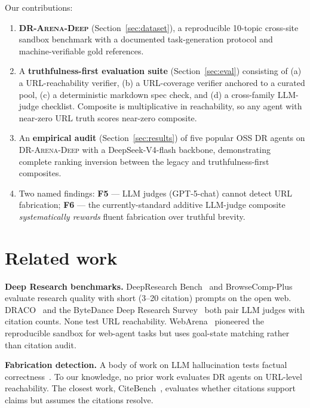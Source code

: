 \documentclass[11pt]{article}
\begin{document}
Our contributions:
\begin{enumerate}[leftmargin=*,itemsep=2pt]
  \item \textbf{\textsc{DR-Arena-Deep}} (Section~\ref{sec:dataset}), a
    reproducible 10-topic cross-site sandbox benchmark with a
    documented task-generation protocol and machine-verifiable gold
    references.
  \item A \textbf{truthfulness-first evaluation suite} (Section~\ref{sec:eval})
    consisting of (a) a URL-reachability verifier, (b) a URL-coverage
    verifier anchored to a curated pool, (c) a deterministic markdown
    spec check, and (d) a cross-family LLM-judge checklist. Composite
    is multiplicative in reachability, so any agent with near-zero URL
    truth scores near-zero composite.
  \item An \textbf{empirical audit} (Section~\ref{sec:results}) of five
    popular OSS DR agents on \textsc{DR-Arena-Deep} with a
    DeepSeek-V4-flash backbone, demonstrating complete ranking inversion
    between the legacy and truthfulness-first composites.
  \item Two named findings:
    \textbf{F5} --- LLM judges (GPT-5-chat) cannot detect URL fabrication;
    \textbf{F6} --- the currently-standard additive LLM-judge composite
    \emph{systematically rewards} fluent fabrication over truthful brevity.
\end{enumerate}

\section{Related work}
\label{sec:related}

\textbf{Deep Research benchmarks.} DeepResearch Bench~\citep{deepresearchbench}
and BrowseComp-Plus~\citep{browsecomp} evaluate research quality with short
(3--20 citation) prompts on the open web. DRACO~\citep{draco} and the ByteDance
Deep Research Survey~\citep{bytedance2025} both pair LLM judges with citation
counts. None test URL reachability. WebArena~\citep{zhou2024webarena} pioneered
the reproducible sandbox for web-agent tasks but uses goal-state matching
rather than citation audit.

\textbf{Fabrication detection.} A body of work on LLM hallucination tests
factual correctness~\citep{hallucheck,truthfulqa}. To our knowledge, no
prior work evaluates DR agents on URL-level reachability. The closest
work, CiteBench~\citep{citebench}, evaluates whether citations support
claims but assumes the citations resolve.
\end{document}
